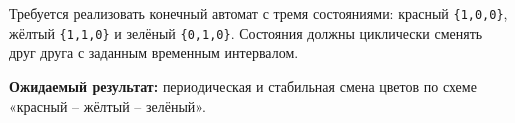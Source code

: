\begin{taskbox}
Требуется реализовать конечный автомат с тремя состояниями: красный \verb|{1,0,0}|, жёлтый \verb|{1,1,0}| и зелёный \verb|{0,1,0}|. Состояния должны циклически сменять друг друга с заданным временным интервалом.

\textbf{Ожидаемый результат:} периодическая и стабильная смена цветов по схеме «красный -- жёлтый -- зелёный».
\end{taskbox}
